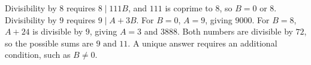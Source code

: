 Divisibility by $8$ requires $8\mid 111B$, and $111$ is coprime to $8$, so $B=0$ or $8$. Divisibility by $9$ requires $9\mid A+3B$. For $B=0$, $A=9$, giving $9000$. For $B=8$, $A+24$ is divisible by $9$, giving $A=3$ and $3888$. Both numbers are divisible by $72$, so the possible sums are $\boxed 9\text{ and }\boxed{11}$. A unique answer requires an additional condition, such as $B\ne 0$.
